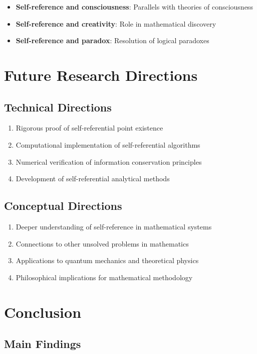 \documentclass[12pt]{article}
\theoremstyle{plain}
\theoremstyle{definition}
\begin{document}
\begin{itemize}
\item \textbf{Self-reference and consciousness}: Parallels with theories of consciousness
\item \textbf{Self-reference and creativity}: Role in mathematical discovery
\item \textbf{Self-reference and paradox}: Resolution of logical paradoxes
\end{itemize}

\section{Future Research Directions}

\subsection{Technical Directions}

\begin{enumerate}
\item Rigorous proof of self-referential point existence
\item Computational implementation of self-referential algorithms
\item Numerical verification of information conservation principles
\item Development of self-referential analytical methods
\end{enumerate}

\subsection{Conceptual Directions}

\begin{enumerate}
\item Deeper understanding of self-reference in mathematical systems
\item Connections to other unsolved problems in mathematics
\item Applications to quantum mechanics and theoretical physics
\item Philosophical implications for mathematical methodology
\end{enumerate}

\section{Conclusion}

\subsection{Main Findings}
\end{document}
